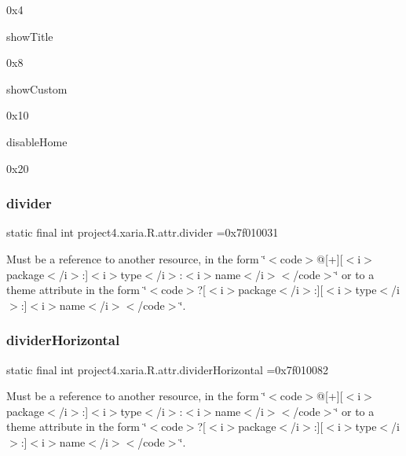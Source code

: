 0x4

{\ttfamily show\+Title}

0x8

{\ttfamily show\+Custom}

0x10

{\ttfamily disable\+Home}

0x20\mbox{\label{classproject4_1_1xaria_1_1R_1_1attr_a9d49fad1327da769734c374cc8b100b9}} 
\subsubsection{\texorpdfstring{divider}{divider}}
{\footnotesize\ttfamily static final int project4.\+xaria.\+R.\+attr.\+divider =0x7f010031\hspace{0.3cm}{\ttfamily [static]}}

Must be a reference to another resource, in the form \char`\"{}$<$code$>$@\mbox{[}+\mbox{]}\mbox{[}$<$i$>$package$<$/i$>$\+:\mbox{]}$<$i$>$type$<$/i$>$\+:$<$i$>$name$<$/i$>$$<$/code$>$\char`\"{} or to a theme attribute in the form \char`\"{}$<$code$>$?\mbox{[}$<$i$>$package$<$/i$>$\+:\mbox{]}\mbox{[}$<$i$>$type$<$/i$>$\+:\mbox{]}$<$i$>$name$<$/i$>$$<$/code$>$\char`\"{}. \mbox{\label{classproject4_1_1xaria_1_1R_1_1attr_ada294fe68899372ef438a76fcd4ea867}} 
\subsubsection{\texorpdfstring{divider\+Horizontal}{dividerHorizontal}}
{\footnotesize\ttfamily static final int project4.\+xaria.\+R.\+attr.\+divider\+Horizontal =0x7f010082\hspace{0.3cm}{\ttfamily [static]}}

Must be a reference to another resource, in the form \char`\"{}$<$code$>$@\mbox{[}+\mbox{]}\mbox{[}$<$i$>$package$<$/i$>$\+:\mbox{]}$<$i$>$type$<$/i$>$\+:$<$i$>$name$<$/i$>$$<$/code$>$\char`\"{} or to a theme attribute in the form \char`\"{}$<$code$>$?\mbox{[}$<$i$>$package$<$/i$>$\+:\mbox{]}\mbox{[}$<$i$>$type$<$/i$>$\+:\mbox{]}$<$i$>$name$<$/i$>$$<$/code$>$\char`\"{}. \mbox{\label{classproject4_1_1xaria_1_1R_1_1attr_a310c724258630e23cb9b834f4dad7154}} 
